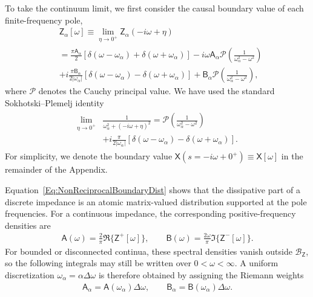 \documentclass[prx,aps,twocolumn,article]{revtex4-2}
\newcommand{\msf}[1]{\mathsf{#1}}
\newcommand{\msZ}{\msf{Z}}
\newcommand{\msA}{\msf{A}}
\newcommand{\msB}{\msf{B}}
\newcommand{\msX}{\msf{X}}
\begin{document}
To take the continuum limit, we first consider the causal boundary value of each finite-frequency pole,
\begin{align}\label{Eq:NonReciprocalBoundaryDist}
    &\msZ_{\alpha}[\omega]
    \equiv
    \lim_{\eta\to0^+}
    \msZ_{\alpha}(-i\omega+\eta)
    \\
    &=
    \frac{\pi\msA_{\alpha}}{2}
    \left[
        \delta(\omega-\omega_{\alpha})
        +
        \delta(\omega+\omega_{\alpha})
    \right]
    -
    i\omega\msA_{\alpha}
    \mathcal{P}
    \left(
        \frac{1}{\omega_{\alpha}^2-\omega^2}
    \right)\nonumber
    \\
    &+
    i\frac{\pi\msB_{\alpha}}{2|\omega_{\alpha}|}
    \left[
        \delta(\omega-\omega_{\alpha})
        -
        \delta(\omega+\omega_{\alpha})
    \right]
    +
    \msB_{\alpha}
    \mathcal{P}
    \left(
        \frac{1}{\omega_{\alpha}^2-\omega^2}
    \right),\nonumber
\end{align}
where $\mathcal{P}$ denotes the Cauchy principal value. We have used the standard Sokhotski--Plemelj identity
\begin{align}
\begin{aligned}
    \lim_{\eta\to0^+}
    &\frac{1}
    {\omega_{\alpha}^2+(-i\omega+\eta)^2}
    =
    \mathcal{P}
    \left(
        \frac{1}{\omega_{\alpha}^2-\omega^2}
    \right)
    \\
    &+
    i\frac{\pi}{2|\omega_{\alpha}|}
    \left[
        \delta(\omega-\omega_{\alpha})
        -
        \delta(\omega+\omega_{\alpha})
    \right].
\end{aligned}
\end{align}
For simplicity, we denote the boundary value
$\msX(s=-i\omega+0^+)\equiv\msX[\omega]$
in the remainder of the Appendix.

Equation~\eqref{Eq:NonReciprocalBoundaryDist} shows that the dissipative part of a discrete impedance is an atomic matrix-valued distribution supported at the pole frequencies. For a continuous impedance, the corresponding positive-frequency densities are
\begin{align}
    \msA(\omega)
    =
    \frac{2}{\pi}
    \Re\{\msZ^+[\omega]\},
    \qquad
    \msB(\omega)
    =
    \frac{2\omega}{\pi}
    \Im\{\msZ^-[\omega]\}.
    \label{Eq:ContinuousPoleMapping}
\end{align}
For bounded or disconnected continua, these spectral densities vanish outside
$\mathcal B_{\msZ}$, so the following integrals may still be written over
$0<\omega<\infty$. A uniform discretization $\omega_\alpha=\alpha\Delta\omega$ is therefore obtained by assigning the Riemann weights
\begin{align}
    \msA_\alpha
    =
    \msA(\omega_\alpha)\Delta\omega,
    \qquad
    \msB_\alpha
    =
    \msB(\omega_\alpha)\Delta\omega.
    \label{Eq:RiemannPoleMapping}
\end{align}
\end{document}
